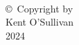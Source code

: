 
\thispagestyle{empty}
\hbox{\ }

\vfill
\renewcommand{\baselinestretch}{1}
\small\normalsize

\vspace{.5in}

\begin{center}
\large{\copyright \hbox{ }Copyright by\\
Kent O'Sullivan  %
\\
2024}
\end{center}

\vfill

\newpage 
